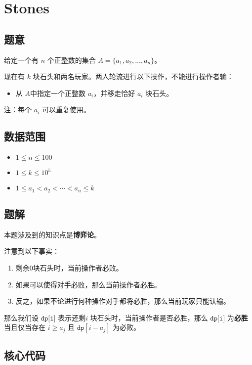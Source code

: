 \section{Stones}
\subsection*{题意}
 给定一个有 $n$ 个正整数的集合 $A = \{ a_1, a_2, \ldots, a_n \}$。
 
 现在有 $k$ 块石头和两名玩家。两人轮流进行以下操作，不能进行操作者输：
 
\begin{itemize}
\item 从 $A$中指定一个正整数 $a_i$，并移走恰好 $a_i$ 块石头。
\end{itemize}

注：每个 $a_i$ 可以重复使用。
\subsection*{数据范围}

\begin{itemize}
\item $1 \leq n \leq 100$
\item $1 \leq k \leq 10^5$
\item $1 \leq a_1 < a_2 < \cdots < a_n \leq k$
\end{itemize}

\subsection*{题解}

本题涉及到的知识点是\textbf{博弈论}。

注意到以下事实：
\begin{enumerate}
\item 剩余$0$块石头时，当前操作者必败。
\item 如果可以使得对手必败，那么当前操作者必胜。
\item 反之，如果不论进行何种操作对手都将必胜，那么当前玩家只能认输。
\end{enumerate}
那么我们设 ${\texttt{dp[i]}}$ 表示还剩$i$ 块石头时，当前操作者是否必胜，那么 ${\texttt{dp[i]}}$ 为\textbf{必胜}当且仅当存在 $i\ge a_j$ 且 ${\texttt{dp}}[i-a_j]$ 为必败。







\subsection*{核心代码}
\inputminted[linenos,autogobble]{cpp}{../Code/K.cpp}
\newpage